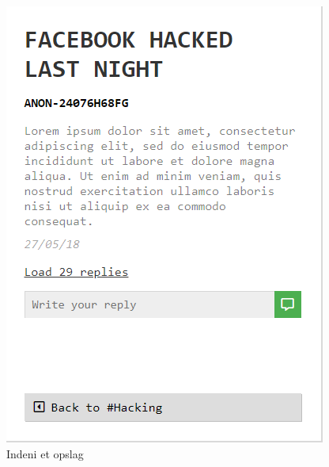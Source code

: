 \begin{table}[H]
\begin{minipage}{.33\textwidth}
\begin{figure}[H]
            \includegraphics[width=0.95\linewidth]{Projectdoc/Assets/Illustrationer/post-inside.png}
            \caption{Indeni et opslag}
            \label{fig:mainpost}
        \end{figure}
    \end{minipage}
    \begin{minipage}{.33\textwidth}
        \begin{figure}[H]
            \centering

\end{figure}
\end{minipage}
\end{table}
